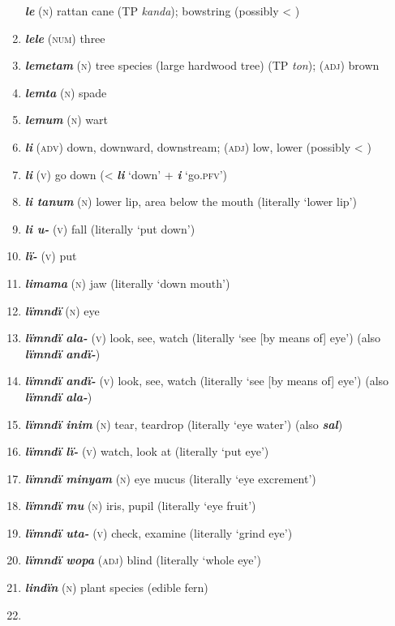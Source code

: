 \begin{enumerate}[noitemsep, label={}, align=left, widest=190, labelsep=1ex,leftmargin=*,itemindent=-10pt]
\textbf{\textit{le}} (\textsc{n}) rattan cane (TP \textit{kanda}); bowstring (possibly < ) \item 
\textbf{\textit{lele}} (\textsc{num}) three \item 
\textbf{\textit{lemetam}} (\textsc{n}) tree species (large hardwood tree) (TP \textit{ton}); (\textsc{adj)} brown \item 
\textbf{\textit{lemta}} (\textsc{n}) spade \item 
\textbf{\textit{lemum}} (\textsc{n}) wart \item 
\textbf{\textit{li}} (\textsc{adv}) down, downward, downstream; (\textsc{adj}) low, lower (possibly < ) \item 
\textbf{\textit{li}} (\textsc{v}) go down (< \textbf{\textit{li}} ‘down’ + \textbf{\textit{i}} ‘go.\textsc{pfv}’) \item 
\textbf{\textit{li tanum}} (\textsc{n}) lower lip, area below the mouth (literally ‘lower lip’) \item 
\textbf{\textit{li u-}} (\textsc{v}) fall (literally ‘put down’) \item 
\textbf{\textit{lï-}} (\textsc{v}) put \item 
\textbf{\textit{limama}} (\textsc{n}) jaw (literally ‘down mouth’) \item 
\textbf{\textit{lïmndï}} (\textsc{n}) eye \item 
\textbf{\textit{lïmndï ala-}} (\textsc{v}) look, see, watch (literally ‘see [by means of] eye’) (also \textbf{\textit{lïmndï andï-}}) \item 
\textbf{\textit{lïmndï andï-}} (\textsc{v}) look, see, watch (literally ‘see [by means of] eye’) (also \textbf{\textit{lïmndï ala-}}) \item 
\textbf{\textit{lïmndï inim}} (\textsc{n}) tear, teardrop (literally ‘eye water’) (also \textbf{\textit{sal}}) \item 
\textbf{\textit{lïmndï lï-}} (\textsc{v}) watch, look at (literally ‘put eye’) \item 
\textbf{\textit{lïmndï minyam}} (\textsc{n}) eye mucus (literally ‘eye excrement’) \item 
\textbf{\textit{lïmndï mu}} (\textsc{n}) iris, pupil (literally ‘eye fruit’) \item 
\textbf{\textit{lïmndï uta-}} (\textsc{v}) check, examine (literally ‘grind eye’) \item 
\textbf{\textit{lïmndï wopa}} (\textsc{adj}) blind (literally ‘whole eye’) \item 
\textbf{\textit{lindïn}} (\textsc{n}) plant species (edible fern) \item 

\end{enumerate}
